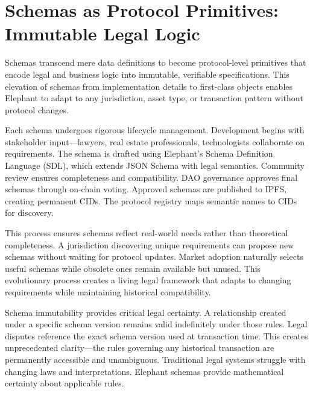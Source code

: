 \section{Schemas as Protocol Primitives: Immutable Legal Logic}

Schemas transcend mere data definitions to become protocol-level primitives that encode legal and business logic into immutable, verifiable specifications. This elevation of schemas from implementation details to first-class objects enables Elephant to adapt to any jurisdiction, asset type, or transaction pattern without protocol changes.

Each schema undergoes rigorous lifecycle management. Development begins with stakeholder input—lawyers, real estate professionals, technologists collaborate on requirements. The schema is drafted using Elephant's Schema Definition Language (SDL), which extends JSON Schema with legal semantics. Community review ensures completeness and compatibility. DAO governance approves final schemas through on-chain voting. Approved schemas are published to IPFS, creating permanent CIDs. The protocol registry maps semantic names to CIDs for discovery.

This process ensures schemas reflect real-world needs rather than theoretical completeness. A jurisdiction discovering unique requirements can propose new schemas without waiting for protocol updates. Market adoption naturally selects useful schemas while obsolete ones remain available but unused. This evolutionary process creates a living legal framework that adapts to changing requirements while maintaining historical compatibility.

Schema immutability provides critical legal certainty. A relationship created under a specific schema version remains valid indefinitely under those rules. Legal disputes reference the exact schema version used at transaction time. This creates unprecedented clarity—the rules governing any historical transaction are permanently accessible and unambiguous. Traditional legal systems struggle with changing laws and interpretations. Elephant schemas provide mathematical certainty about applicable rules.

